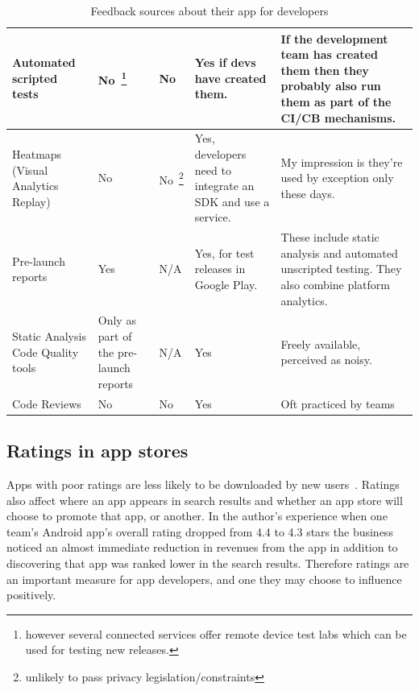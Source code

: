 \begin{table}[H]
\begin{tabular}{L{2cm} L{2.4cm} L{3cm} L{2.4cm} L{4cm}}
		Automated scripted tests  & No~\footnote{however several connected services offer remote device test labs which can be used for testing new releases.} & No & Yes if devs have created them. & If the development team has created them then they probably also run them as part of the CI/CB mechanisms. \\ \midrule
		Heatmaps (Visual Analytics Replay) & No & No~\footnote{unlikely to pass privacy legislation/constraints} & Yes, developers need to integrate an SDK and use a service. & My impression is they’re used by exception only these days. \\ \midrule
		Pre-launch reports & Yes & N/A & Yes, for test releases in Google Play. & These include static analysis and automated unscripted testing. They also combine platform analytics. \\ \midrule
		Static Analysis Code Quality tools & Only as part of the pre-launch reports & N/A & Yes & Freely available, perceived as noisy. \\ \midrule
		Code Reviews & No & No & Yes & Oft practiced by teams \\
		\bottomrule
	\end{tabular}
	\caption{Feedback sources about their app for developers}
	\label{tab:feedback-sources-about-their-app-for-devs}
\end{table}


\vspace{2\baselineskip}

\FloatBarrier
\subsection{Ratings in app stores}
Apps with poor ratings are less likely to be downloaded by new users~. Ratings also affect where an app appears in search results and whether an app store will choose to promote that app, or another. In the author's experience when one team's Android app's overall rating dropped from 4.4 to 4.3 stars the business noticed an almost immediate reduction in revenues from the app in addition to discovering that app was ranked lower in the search results. Therefore ratings are an important measure for app developers, and one they may choose to influence positively. 

